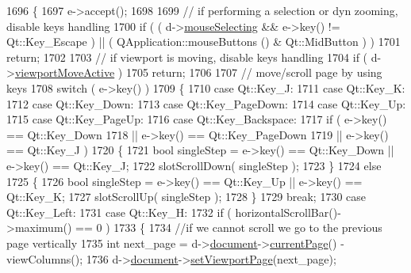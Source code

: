 \begin{DoxyCode}
1696 \{
1697     e->accept();
1698 
1699     \textcolor{comment}{// if performing a selection or dyn zooming, disable keys handling}
1700     \textcolor{keywordflow}{if} ( ( d->\hyperlink{classPageViewPrivate_a8819b152a8279b75359af2a3e0567681}{mouseSelecting} && e->key() != Qt::Key\_Escape ) || ( QApplication::mouseButtons 
      () & Qt::MidButton ) )
1701         \textcolor{keywordflow}{return};
1702 
1703     \textcolor{comment}{// if viewport is moving, disable keys handling}
1704     \textcolor{keywordflow}{if} ( d->\hyperlink{classPageViewPrivate_acc47dfc95cad4f126c4dbd3e8f31e43b}{viewportMoveActive} )
1705         \textcolor{keywordflow}{return};
1706 
1707     \textcolor{comment}{// move/scroll page by using keys}
1708     \textcolor{keywordflow}{switch} ( e->key() )
1709     \{
1710         \textcolor{keywordflow}{case} Qt::Key\_J:
1711         \textcolor{keywordflow}{case} Qt::Key\_K:
1712         \textcolor{keywordflow}{case} Qt::Key\_Down:
1713         \textcolor{keywordflow}{case} Qt::Key\_PageDown:
1714         \textcolor{keywordflow}{case} Qt::Key\_Up:
1715         \textcolor{keywordflow}{case} Qt::Key\_PageUp:
1716         \textcolor{keywordflow}{case} Qt::Key\_Backspace:
1717             \textcolor{keywordflow}{if} ( e->key() == Qt::Key\_Down
1718                  || e->key() == Qt::Key\_PageDown
1719                  || e->key() == Qt::Key\_J )
1720             \{
1721                 \textcolor{keywordtype}{bool} singleStep = e->key() == Qt::Key\_Down || e->key() == Qt::Key\_J;
1722                 slotScrollDown( singleStep );
1723             \}
1724             \textcolor{keywordflow}{else}
1725             \{
1726                 \textcolor{keywordtype}{bool} singleStep = e->key() == Qt::Key\_Up || e->key() == Qt::Key\_K;
1727                 slotScrollUp( singleStep );
1728             \}
1729             \textcolor{keywordflow}{break};
1730         \textcolor{keywordflow}{case} Qt::Key\_Left:
1731         \textcolor{keywordflow}{case} Qt::Key\_H:
1732             \textcolor{keywordflow}{if} ( horizontalScrollBar()->maximum() == 0 )
1733             \{
1734                 \textcolor{comment}{//if we cannot scroll we go to the previous page vertically}
1735                 \textcolor{keywordtype}{int} next\_page = d->\hyperlink{classPageViewPrivate_a50645b9853306cffd74e51efb677e5b4}{document}->\hyperlink{classOkular_1_1Document_a42ec374d73794bf56d7e7b11f1f56319}{currentPage}() - viewColumns();
1736                 d->\hyperlink{classPageViewPrivate_a50645b9853306cffd74e51efb677e5b4}{document}->\hyperlink{classOkular_1_1Document_ac3bdbd5137c7fd4d5e960646affc25ec}{setViewportPage}(next\_page);

\end{DoxyCode}
